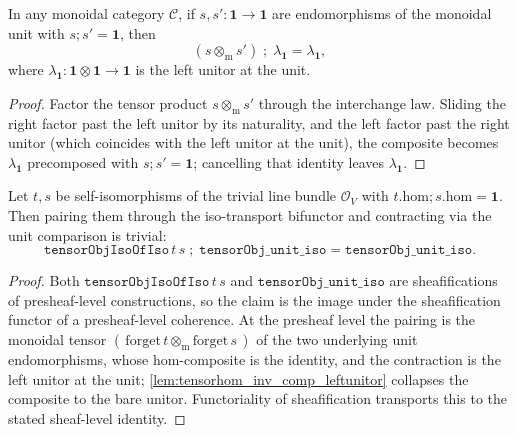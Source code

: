 \begin{lemma}




  \label{lem:tensorhom_inv_comp_leftunitor}
  In any monoidal category \(\mathcal C\), if \(s, s' : \mathbf 1 \to \mathbf 1\) are endomorphisms
  of the monoidal unit with \(s \mathbin{;} s' = \mathbf 1\), then
  \[
    (s \otimes_{\mathrm m} s') \;\mathbin{;}\; \lambda_{\mathbf 1} = \lambda_{\mathbf 1},
  \]
  where \(\lambda_{\mathbf 1} : \mathbf 1 \otimes \mathbf 1 \to \mathbf 1\) is the left unitor at the
  unit.
\end{lemma}
\begin{proof}

\leanok
  Factor the tensor product \(s \otimes_{\mathrm m} s'\) through the interchange law. Sliding the
  right factor past the left unitor by its naturality, and the left factor past the right unitor
  (which coincides with the left unitor at the unit), the composite becomes \(\lambda_{\mathbf 1}\)
  precomposed with \(s \mathbin{;} s' = \mathbf 1\); cancelling that identity leaves
  \(\lambda_{\mathbf 1}\).
\end{proof}

\begin{lemma}




  \label{lem:tensorobjisoofiso_comp_unit_iso}
  Let \(t, s\) be self-isomorphisms of the trivial line bundle \(\mathcal O_V\) with
  \(t.\mathrm{hom} \mathbin{;} s.\mathrm{hom} = \mathbf 1\). Then pairing them through the
  iso-transport bifunctor and contracting via the unit comparison is trivial:
  \[
    \mathtt{tensorObjIsoOfIso}\,t\,s \;\mathbin{;}\; \mathtt{tensorObj\_unit\_iso}
      = \mathtt{tensorObj\_unit\_iso}.
  \]
\end{lemma}
\begin{proof}
  \leanok
  Both \(\mathtt{tensorObjIsoOfIso}\,t\,s\) and \(\mathtt{tensorObj\_unit\_iso}\) are sheafifications
  of presheaf-level constructions, so the claim is the image under the sheafification functor of a
  presheaf-level coherence. At the presheaf level the pairing is the monoidal tensor
  \((\,\mathrm{forget}\,t \otimes_{\mathrm m} \mathrm{forget}\,s\,)\) of the two underlying unit
  endomorphisms, whose hom-composite is the identity, and the contraction is the left unitor at the
  unit; \cref{lem:tensorhom_inv_comp_leftunitor} collapses the composite to the bare unitor.
  Functoriality of sheafification transports this to the stated sheaf-level identity.
\end{proof}

